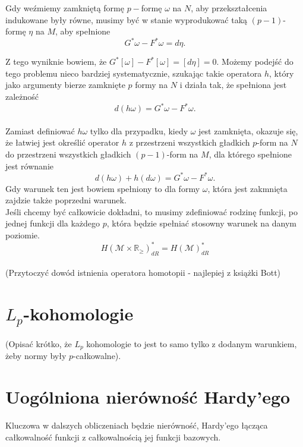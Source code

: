 \documentclass[licencjacka]{pracamgr}
\theoremstyle{definition}
\theoremstyle{definition}
\theoremstyle{plain}
\theoremstyle{plain}
\begin{document}
Gdy weźmiemy zamkniętą formę $p-$formę $\omega$ na $N$, aby
przekształcenia indukowane były równe, musimy być w stanie
wyprodukować taką $(p-1)$-formę $\eta$ na $M$, aby spełnione
\[
    G^\ast \omega - F^\ast \omega = d\eta.
\]

Z tego wyniknie bowiem, że
$ G^\ast [\omega] - F^\ast [\omega] =
[d\eta] = 0$.
Możemy podejść do tego problemu nieco bardziej systematycznie, 
szukając takie operatora
$h$, który jako argumenty bierze zamknięte $p$ formy na $N$
i działa tak, że spełniona jest zależność
\[
    d(h\omega) = G^\ast \omega - F^\ast \omega.
\] \\

Zamiast definiować $h \omega$ tylko dla przypadku, kiedy $\omega$
jest zamknięta, okazuje się, że łatwiej jest określić operator
$h$ z przestrzeni wszystkich gładkich $p$-form na $N$
do przestrzeni wszystkich gładkich $(p-1)$-form na $M$,
dla którego spełnione jest równanie
\[
    d(h\omega) + h(d\omega) = G^\ast \omega - F^\ast \omega.
\]
Gdy warunek ten jest bowiem spełniony to dla formy $\omega$, która
jest zakmnięta zajdzie także poprzedni warunek. \\

Jeśli chcemy być całkowicie dokładni, to musimy
zdefiniować rodzinę funkcji, po jednej funkcji dla każdego $p$, która
będzie spełniać stosowny warunek na danym poziomie.
\[
    H(\mathcal{M} \times \mathbb{R}_{\geq})_{dR}^\ast = H(\mathcal{M})_{dR}^\ast
\] \\


(Przytoczyć dowód istnienia operatora homotopii - najlepiej z książki Bott)

\section{$L_p$-kohomologie}
(Opisać krótko, że $L_p$ kohomologie to jest to samo tylko z dodanym warunkiem, 
żeby normy były $p$-całkowalne).


\section{Uogólniona nierówność Hardy'ego}
Kluczowa w dalszych obliczeniach będzie nierówność, Hardy'ego łącząca całkowalność
funkcji z całkowalnością jej funkcji bazowych.
\end{document}
